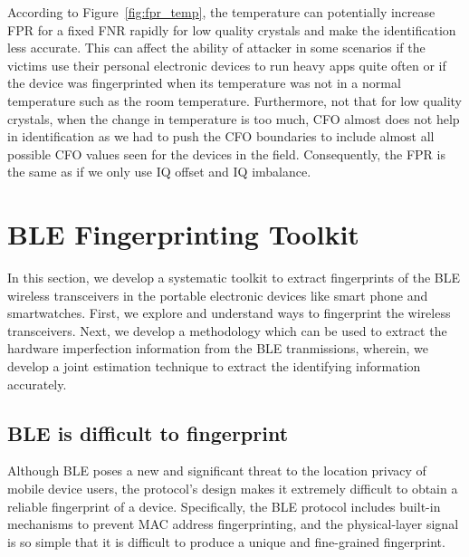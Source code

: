 According to Figure~\ref{fig:fpr_temp}, the temperature can potentially increase FPR for a fixed FNR rapidly for low quality crystals and make the identification less accurate. This can affect the ability of attacker in some scenarios if the victims use their personal electronic devices to run heavy apps quite often or if the device was fingerprinted when its temperature was not in a normal temperature such as the room temperature. Furthermore, not that for low quality crystals, when the change in temperature is too much, CFO almost does not help in identification as we had to push the CFO boundaries to include almost all possible CFO values seen for the devices in the field. Consequently, the FPR is the same as if we only use IQ offset and IQ imbalance.









\section{BLE Fingerprinting Toolkit}
\label{sec:methodology}

In this section, we develop a systematic toolkit to extract fingerprints of the BLE wireless transceivers in the
portable electronic devices like smart phone and smartwatches. First, we explore and understand ways to fingerprint the wireless transceivers. Next, we develop a 
methodology which can be used to extract the hardware imperfection information from the BLE tranmissions, wherein, 
we develop a joint estimation technique to extract the identifying information accurately. 

\subsection{BLE is difficult to fingerprint} %
\label{sec:motivation:diff}

Although BLE poses a new and significant threat to the location privacy of
mobile device users, the protocol's design makes it extremely difficult to
obtain a reliable fingerprint of a device.
%
Specifically, the BLE protocol includes built-in mechanisms to prevent MAC
address fingerprinting, and the physical-layer signal is so simple that it is
difficult to produce a unique and fine-grained fingerprint.

